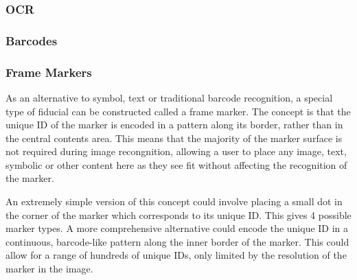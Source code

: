 \clearpage

\subsubsection{OCR}


\subsubsection{Barcodes}







\subsubsection{Frame Markers}
\label{ch:back:borders}

As an alternative to symbol, text or traditional barcode recognition, a special type of fiducial can be constructed called a frame marker. The concept is that the unique ID of the marker is encoded in a pattern along its border, rather than in the central contents area. This means that the majority of the marker surface is not required during image recongnition, allowing a user to place any image, text, symbolic or other content here as they see fit without affecting the recognition of the marker.

An extremely simple version of this concept could involve placing a small dot in the corner of the marker which corresponds to its unique ID. This gives 4 possible marker types. A more comprehensive alternative could encode the unique ID in a continuous, barcode-like pattern along the inner border of the marker. This could allow for a range of hundreds of unique IDs, only limited by the resolution of the marker in the image.

